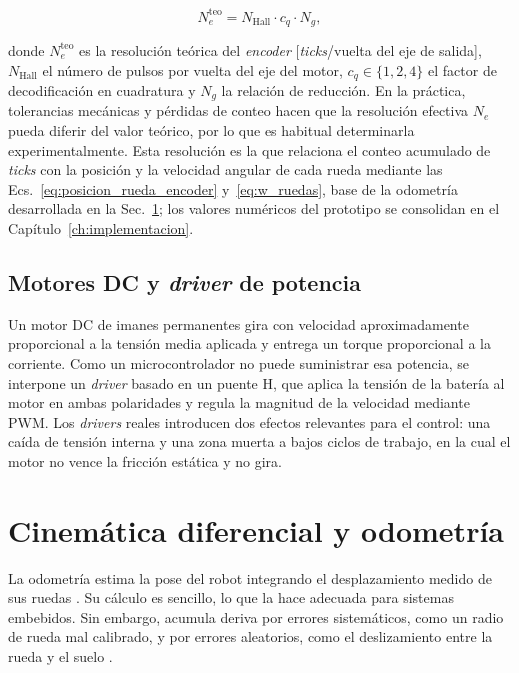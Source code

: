 \begin{equation}
N_e^{\mathrm{teo}} = N_{\mathrm{Hall}} \cdot c_q \cdot N_g,
\label{eq:resolucion_encoder}
\end{equation}

\noindent donde $N_e^{\mathrm{teo}}$ es la resolución teórica del \textit{encoder}
[\textit{ticks}/vuelta del eje de salida], $N_{\mathrm{Hall}}$ el número de pulsos
por vuelta del eje del motor, $c_q\in\{1,2,4\}$ el factor de decodificación
en cuadratura y $N_g$ la relación de reducción. En la práctica, tolerancias
mecánicas y pérdidas de conteo hacen que la resolución efectiva $N_e$ pueda
diferir del valor teórico, por lo que es habitual determinarla
experimentalmente. Esta resolución es la que relaciona el conteo acumulado
de \textit{ticks} con la posición y la velocidad angular de cada rueda mediante las
Ecs.~\eqref{eq:posicion_rueda_encoder} y~\eqref{eq:w_ruedas}, base de la
odometría desarrollada en la Sec.~\ref{sec:odometria}; los valores numéricos
del prototipo se consolidan en el Capítulo~\ref{ch:implementacion}.

\subsection{Motores DC y \texorpdfstring{\textit{driver}}{driver} de potencia}
\label{sec:motores_marco}

Un motor DC de imanes permanentes gira con velocidad aproximadamente proporcional a la tensión media aplicada y entrega un torque proporcional a la corriente. Como un microcontrolador no puede suministrar esa potencia, se interpone un \textit{driver} basado en un puente H, que aplica la tensión de la batería al motor en ambas polaridades y regula la magnitud de la velocidad mediante \gls{PWM}. Los \textit{drivers} reales introducen dos efectos relevantes para el control: una caída de tensión interna y una zona muerta a bajos ciclos de trabajo, en la cual el motor no vence la fricción estática y no gira.

\section{Cinemática diferencial y odometría}
\label{sec:odometria}

La odometría estima la pose del robot integrando el desplazamiento medido de
sus ruedas \citep{ferreira2023differential}. Su cálculo es sencillo, lo que la hace
adecuada para sistemas embebidos. Sin embargo, acumula deriva por errores
sistemáticos, como un radio de rueda mal calibrado, y por errores aleatorios, como
el deslizamiento entre la rueda y el suelo \citep[Sec.~6.1]{corke2023}.

